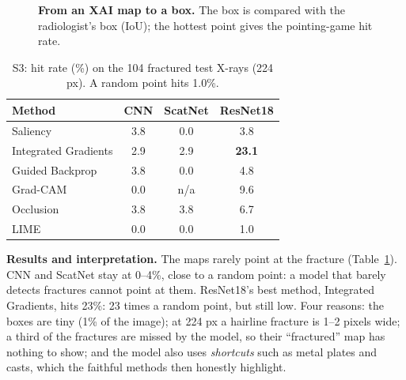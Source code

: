 \documentclass[conference]{IEEEtran}
\begin{document}
\begin{figure}[t]
\centering
{}
\caption{\textbf{From an XAI map to a box.} The box is compared with the radiologist's box (IoU); the hottest point
gives the pointing-game hit rate.}
\label{fig:boxes}
\end{figure}

\begin{table}[t]
\centering
\caption{S3: hit rate (\%) on the 104 fractured test X-rays (224 px). A random point hits 1.0\%.}
\label{tab:hits}
\renewcommand{\arraystretch}{1.1}
\begin{tabular}{lccc}
\toprule
Method & CNN & ScatNet & ResNet18 \\
\midrule
Saliency             & 3.8 & 0.0 & 3.8 \\
Integrated Gradients & 2.9 & 2.9 & \textbf{23.1} \\
Guided Backprop      & 3.8 & 0.0 & 4.8 \\
Grad-CAM             & 0.0 & n/a & 9.6 \\
Occlusion            & 3.8 & 3.8 & 6.7 \\
LIME                 & 0.0 & 0.0 & 1.0 \\
\bottomrule
\end{tabular}
\end{table}

\textbf{Results and interpretation.} The maps rarely point at the fracture (Table~\ref{tab:hits}). CNN and ScatNet stay
at 0--4\%, close to a random point: a model that barely detects fractures cannot point at them. ResNet18's best method,
Integrated Gradients, hits 23\%: 23 times a random point, but still low. Four reasons: the boxes are tiny (1\% of the
image); at 224 px a hairline fracture is 1--2 pixels wide; a third of the fractures are missed by the model, so their
``fractured'' map has nothing to show; and the model also uses \emph{shortcuts} such as metal plates and casts, which the
faithful methods then honestly highlight.
\end{document}
